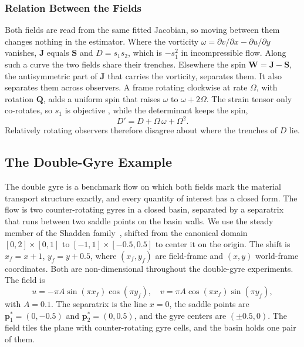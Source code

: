 \documentclass[lettersize,journal]{IEEEtran}
\begin{document}
\subsubsection{Relation Between the Fields}
Both fields are read from the same fitted Jacobian, so moving between
them changes nothing in the estimator. Where the vorticity
$\omega = \partial v/\partial x - \partial u/\partial y$ vanishes,
$\mathbf{J}$ equals $\mathbf{S}$ and $D = s_1 s_2$, which is $-s_1^2$ in
incompressible flow. Along such a curve the two fields share their
trenches. Elsewhere the spin $\mathbf{W} = \mathbf{J} - \mathbf{S}$, the
antisymmetric part of $\mathbf{J}$ that carries the vorticity, separates
them. It also separates them across observers. A frame rotating clockwise at rate
$\Omega$, with rotation $\mathbf{Q}$, adds a uniform spin that raises
$\omega$ to $\omega + 2\Omega$. The strain tensor only co-rotates, so
$s_1$ is objective \cite{19}, while the determinant keeps the spin,
\begin{equation}
    D' = D + \Omega\,\omega + \Omega^2 .
    \label{eq:D_not_objective}
\end{equation}
Relatively rotating observers therefore disagree about where the
trenches of $D$ lie. 

\subsection{The Double-Gyre Example}
\label{sec:dg_example}

The double gyre is
a benchmark flow on which both fields mark the material transport structure
exactly, and every
quantity of interest has a closed form. The flow is two counter-rotating gyres in a
closed basin, separated by a separatrix that runs between two saddle points on
the basin walls. We use the steady member of the Shadden
family~\cite{17}, shifted from the canonical domain
$[0,2]\times[0,1]$ to $[-1,1]\times[-0.5,0.5]$ to center it on the origin. The
shift is $x_f = x + 1$, $y_f = y + 0.5$, where $(x_f, y_f)$ are field-frame and
$(x, y)$ world-frame coordinates. Both are non-dimensional throughout the
double-gyre experiments. The field is
\begin{equation}
u = -\pi A \sin(\pi x_f)\cos(\pi y_f), \quad
v = \pi A \cos(\pi x_f)\sin(\pi y_f),
\label{eq:dg_u}
\end{equation}
with $A = 0.1$. The separatrix is the line $x = 0$, the saddle points are
$\mathbf{p}_1^* = (0, -0.5)$ and $\mathbf{p}_2^* = (0, 0.5)$, and the gyre
centers are $(\pm 0.5, 0)$. The field tiles the plane with counter-rotating
gyre cells, and the basin holds one pair of them.
\end{document}
